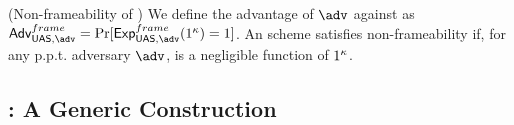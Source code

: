 \begin{definition}{(Non-frameability of \UAS)}
  \label{def:frame-uas}
  We define the advantage \AdvNonframe of $\adv$ against \ExpNonframe as
  $\AdvNonframe=\Pr\lbrack\ExpNonframe(1^\secpar)=1\rbrack$.
  An \UAS scheme satisfies non-frameability if, for any p.p.t. adversary $\adv$,
  \AdvNonframe is a negligible function of $1^\kappa$.
\end{definition}



\subsection{\CUASGen: A Generic \UAS Construction}
\label{ssec:generic-construction-uas}

